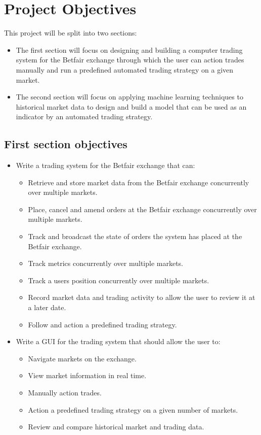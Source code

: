 \section{Project Objectives}

This project will be split into two sections: 
	
	\begin{itemize}
		\item The first section will focus on designing and building a computer trading system for the Betfair exchange through which the user can action trades manually and run a predefined automated trading strategy on a given market.
		\item The second section will focus on applying machine learning techniques to historical market data to design and build a model that can be used as an indicator by an automated trading strategy.
	\end{itemize}

\subsection{First section objectives}

	\begin{itemize}
		\item Write a trading system for the Betfair exchange that can:
			\begin{itemize}
				\item Retrieve and store market data from the Betfair exchange concurrently over multiple markets.
				\item Place, cancel and amend orders at the Betfair exchange concurrently over multiple markets.
				\item Track and broadcast the state of orders the system has placed at the Betfair exchange.
				\item Track metrics concurrently over multiple markets.
				\item Track a users position concurrently over multiple markets.
				\item Record market data and trading activity to allow the user to review it at a later date.
				\item Follow and action a predefined trading strategy.
			\end{itemize}
		\item Write a GUI for the trading system that should allow the user to:
			\begin{itemize}
				\item Navigate markets on the exchange.
				\item View market information in real time.
				\item Manually action trades.
				\item Action a predefined trading strategy on a given number of markets.
				\item Review and compare historical market and trading data.
			\end{itemize}
	\end{itemize}

